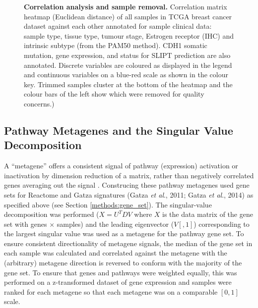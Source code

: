 \begin{figure}[!ht]
   \caption[Correlation analysis and sample removal]{\textbf{Correlation analysis and sample removal.} Correlation matrix heatmap (Euclidean distance) of all samples in TCGA breast cancer dataset against each other annotated for sample clinical data: sample type, tissue type, tumour stage, Estrogen receptor (IHC) and intrinsic subtype (from the PAM50 method). CDH1 somatic mutation, gene expression, and status for SLIPT prediction are also annotated. Discrete variables are coloured as displayed in the legend and continuous variables on a blue-red scale as shown in the colour key. Trimmed samples cluster at the bottom of the heatmap and the colour bars of the left show which were removed for quality concerns.)}
\label{fig:corr_map}
\end{figure}

\subsection{Pathway Metagenes and the Singular Value Decomposition} \label{methods:metagene}
A ``metagene'' offers a consistent signal of pathway (expression) activation or inactivation by dimension reduction of a matrix, rather than negatively correlated genes averaging out the signal \citep{Huang2003}. Construcing these pathway metagenes used gene sets for Reactome and Gatza signatures (Gatza \textit{et al}., 2011; Gatza \textit{et al}., 2014) as specified above (see Section \ref{methods:gene_set}). The singular-value decomposition was performed ($X = U^{T} D V$ where $X$ is the data matrix of the gene set with genes $\times$ samples) and the leading eigenvector ($V[,1]$) corresponding to the largest singular value was used as a metagene for the pathway gene set. To ensure consistent directionality of metagene signals, the median of the gene set in each sample was calculated and correlated against the metagene with the (arbitrary) metagene direction is reversed to conform with the majority of the gene set. To ensure that genes and pathways were weighted equally, this was performed on a z-transformed dataset of gene expression and samples were ranked for each metagene so that each metagene was on a comparable $[0,1]$ scale. 

